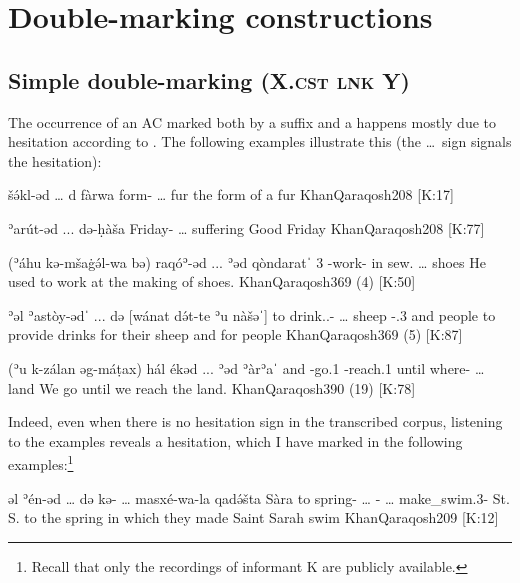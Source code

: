 \section{Double-marking constructions}
\label{ss:Qar_double}

\subsection{Simple double-marking (X.\textsc{cst} \textsc{lnk} Y)}  \label{ss:Qar_double_1}

The occurrence of an AC marked both by a \cst* suffix and a \lnk* happens mostly due to hesitation according to \citet[208]{KhanQaraqosh}. The following examples illustrate this (the \ldots\ sign signals the hesitation):

{šə́kl-əd \ldots{} d\cb{} fàrwa}
{form-\cst{} \ldots{} \lnk\cb{} fur}
{the form of a fur}
{KhanQaraqosh}{208 {[K:17]}}

{ʾarút-əd ... də-ḥàša}
{Friday-\cst{} \ldots{} \lnk\cb{} suffering}
{Good Friday}
{KhanQaraqosh}{208 {[K:77]}}

{(ʾáhu kə-mšaġə́l-wa bə\cb{}) raqóʾ-əd ... ʾəd qòndaratˈ}
{3\masc{} \ind-work-\pst{} in\cb{}  sew.\inf{} \ldots{} \lnk{} shoes}
{He used to work at the making of shoes.}
{KhanQaraqosh}{369 (4) {[K:50]}}

{ʾəl\cb{} ʾastòy-ədˈ ... də\cb{} [wánat də́t-te ʾu\cb{} nàšəˈ]}
{to\cb{} drink.\caus.\inf-\cst{} \ldots{} \lnk\cb{} sheep \lnk-\poss.3\pl{} and\cb{} people}
{to  provide drinks for their sheep and for people}
{KhanQaraqosh}{369 (5) {[K:87]}}

{(ʾu\cb{} k-zálan əg-máṭax) hál ékəd ... ʾəd\cb{} ʾàrʾaˈ }
{and\cb{} \ind-go.1\pl{} \ind-reach.1\pl{} until where-\cst{} \ldots{} \lnk\cb{} land}
{We go until we reach the land.}
{KhanQaraqosh}{390 (19) {[K:78]}}

  
Indeed, even when there is no hesitation sign in the transcribed corpus, listening to the examples reveals a hesitation, which I have marked in the following examples:\footnote{Recall that only the recordings of informant K are publicly available.}

{əl\cb{} ʾén-əd \ldots{} də\cb{} kə- \ldots{} masxé-wa-la qadə́šta Sàra}
{to\cb{} spring-\cst{} \ldots{} \lnk\cb{} \ind- \ldots{} make\_swim.3\pl-\fem{} St. S.}
{to the spring in which they made Saint Sarah swim}
{KhanQaraqosh}{209 {[K:12]}}


